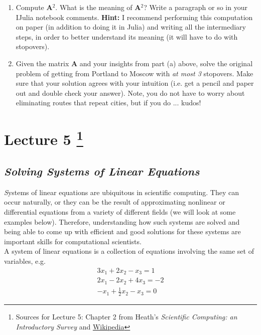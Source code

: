 \documentclass[11pt,a4paper,oneside]{report}
\begin{document}
\begin{enumerate}
\begin{enumerate}
\item Compute {\bf A}$^2$. What is the meaning of {\bf A}$^2$? Write a paragraph or so in your IJulia notebook comments. {\bf Hint: }I recommend performing this computation on paper (in addition to doing it in Julia) and writing all the intermediary steps, in order to better understand its meaning (it will have to do with stopovers).
\item Given the matrix {\bf A} and your insights from part (a) above, solve the original problem of getting from Portland to Moscow with \emph{at most 3} stopovers. Make sure that your solution agrees with your intuition (i.e. get a pencil and paper out and double check your answer). Note, you do not have to worry about eliminating routes that repeat cities, but if you do ... kudos!
\end{enumerate}
\end{enumerate}


\newpage
\section*{Lecture 5 \footnote{Sources for Lecture 5: Chapter 2 from Heath's {\it Scientific Computing: an Introductory Survey} and \href{https://en.wikipedia.org/wiki/System\_of\_linear_equations}{Wikipedia}}}

{\center\color{magenta}
\subsection*{\it\huge Solving Systems of Linear Equations}}
{\it\huge S}ystems of linear equations are ubiquitous in scientific computing. They can occur naturally, or they can be the result of approximating nonlinear or differential equations from a variety of different fields (we will look at some examples below). Therefore, understanding how such systems are solved and being able to come up with efficient and good solutions for these systems are important skills for computational scientists.\\

A system of linear equations is a collection of equations involving the same set of variables, e.g.
\begin{eqnarray*}
3x_1 + 2x_2 - x_3 = 1\\
2x_1 - 2x_2 + 4x_3 = -2\\
-x_1 + \frac{1}{2}x_2 - x_3 = 0
\end{eqnarray*}
\end{document}
